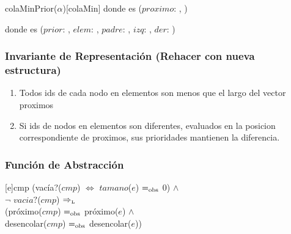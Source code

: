		\begin{Estructura}{colaMinPrior($\alpha$)}[colaMin]
			\- \- \- \- donde  es ($proximo$: ,
			)
			
			\- \- \- \- donde  es ($prior$: , $elem$: \TipoVariable{$\alpha$}, $padre$: , $izq$: , $der$: )
			

	\subsubsection{Invariante de Representación (Rehacer con nueva estructura)}

		\renewcommand{\labelenumi}{(\Roman{enumi})}

		\begin{enumerate}
			\item Todos ids de cada nodo en elementos son menos que el largo del vector proximos 
			\item Si ids de nodos en elementos son diferentes, evaluados en la posicion correspondiente de proximos, sus prioridades mantienen la diferencia.  
		\end{enumerate}


	\mbox{}

	\subsubsection{Función de Abstracción}


		[e]{cmp}{
			(vacía?($cmp$) $\Leftrightarrow$ $tamano$($e$) $=_{\mathrm{obs}}$ 0) $\land$ \\
			 $\neg$ $vacia?$($cmp$) $\Rightarrow_{\mathrm{\scriptscriptstyle{L}}}$ \\
		  	 (próximo($cmp$) $=_{\mathrm{obs}}$ próximo($e$) $\land$ \\
			 desencolar($cmp$) $=_{\mathrm{obs}}$ desencolar($e$))}


\end{Estructura}
